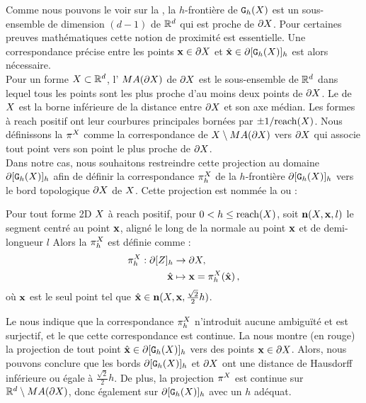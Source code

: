 Comme nous pouvons le voir sur la , la $h$-frontière de
$\mathtt{G}_{h}(X)$ est un sous-ensemble de dimension $(d-1)$ de $\mathbb{R}^d$ qui est proche
de $\partial X$. Pour certaines preuves mathématiques cette notion de
proximité est essentielle. Une correspondance précise entre les points $\mathbf{x} \in
\partial X$ et $\hat{\mathbf{x}}\in \partial\lbrack \mathtt{G}_{h}(X) \rbrack_{h}$ est alors nécessaire.
%
\\
%
Pour un forme $X \subset \mathbb{R}^d$, l' $MA(\partial X)$ de $\partial X$
est le sous-ensemble de $\mathbb{R}^d$ dans lequel tous les points sont les plus proche
d'au moins deux points de $\partial X$. Le  de $X$ est la borne
inférieure de la distance entre $\partial X$ et son axe médian. Les formes à reach
positif ont leur courbures principales bornées par $\pm 1 / \mathrm{reach}(X)$.
Nous définissons la  $\pi^{X}$ comme la
correspondance de $X \setminus MA(\partial X)$ vers $\partial X$ qui associe tout point
vers son point le plus proche de $\partial X$.
%
\\
%
Dans notre cas, nous souhaitons restreindre cette projection au domaine
$\partial\lbrack \mathtt{G}_{h}(X) \rbrack_{h}$ afin de définir la correspondance $\pi_h^{X}$ de la
$h$-frontière $\partial\lbrack \mathtt{G}_{h}(X) \rbrack_{h}$ vers le bord topologique $\partial X$ de
$X$. Cette projection est nommée la  ou
 \cite{Lachaud2006} :
%
\begin{definition}{}
\label{def:projection}
%
  Pour tout forme 2D $X$ à reach positif, pour $0 < h \le \mathrm{reach}(X)$,
  soit $\mathbf{n}(X,\mathbf{x},l)$ le segment centré au point $\mathbf{x}$, aligné le
  long de la normale au point $\mathbf{x}$ et de demi-longueur $l$ Alors la
   $\pi_h^{X}$ est définie comme :
  \begin{align}
    \pi_h^{X}: \partial\lbrack Z \rbrack_{h} &\rightarrow \partial X, \nonumber \\
    \hat{\mathbf{x}} &\mapsto \mathbf{x}=\pi_h^{X}(\hat{\mathbf{x}}) \,,
  \end{align}
  où $\mathbf{x}$ est le seul point tel que $\hat{\mathbf{x}} \in
  \mathbf{n}(X,\mathbf{x},\frac{\sqrt{2}}{2}h)$.
%
\end{definition}
%
Le  nous indique que la correspondance $\pi_h^{X}$
n'introduit aucune ambiguïté et est surjectif, et le
 que cette correspondance est continue. La
 nous montre (en rouge) la projection de tout point
$\hat{\mathbf{x}} \in \partial\lbrack \mathtt{G}_{h}(X) \rbrack_{h}$ vers des points $\mathbf{x} \in \partial X$. Alors,
nous pouvons conclure que les bords $\partial\lbrack \mathtt{G}_{h}(X) \rbrack_{h}$ et $\partial X$ ont une
distance de Hausdorff inférieure ou égale à $\frac{\sqrt{2}}{2}h$. De plus, la
projection $\pi^{X}$ est continue sur $\mathbb{R}^d \setminus MA(\partial X)$, donc
également sur $\partial\lbrack \mathtt{G}_{h}(X) \rbrack_{h}$ avec un $h$ adéquat.
%
